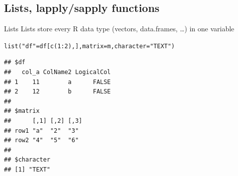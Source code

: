 \documentclass[xcolor=table,       handout,    xcolor=dvipsnames]{beamer}\usepackage[]{graphicx}\usepackage[]{color}
\makeatletter
\newcommand{\hlnum}[1]{\textcolor[rgb]{0,0,0}{#1}}
\newcommand{\hlstr}[1]{\textcolor[rgb]{0.545,0.137,0.137}{#1}}
\newcommand{\hlopt}[1]{\textcolor[rgb]{0,0,0}{#1}}
\newcommand{\hlstd}[1]{\textcolor[rgb]{0,0,0}{#1}}
\newcommand{\hlkwc}[1]{\textcolor[rgb]{1,0,1}{#1}}
\newcommand{\hlkwd}[1]{\textcolor[rgb]{0,0,1}{#1}}
\newenvironment{kframe}{%
 \def\at@end@of@kframe{}%
 \ifinner\ifhmode%
  \def\at@end@of@kframe{\end{minipage}}%
  \begin{minipage}{\columnwidth}%
 \fi\fi%
 \def\FrameCommand##1{\hskip\@totalleftmargin \hskip-\fboxsep
 \colorbox{shadecolor}{##1}\hskip-\fboxsep
     \hskip-\linewidth \hskip-\@totalleftmargin \hskip\columnwidth}%
 \MakeFramed {\advance\hsize-\width
   \@totalleftmargin\z@ \linewidth\hsize
   \@setminipage}}%
 {\par\unskip\endMakeFramed%
 \at@end@of@kframe}
\newenvironment{knitrout}{}{} %
\makeatother
\begin{document}
\subsection{Lists, lapply/sapply functions}

\begin{frame}[fragile]{Lists}
Lists store every R data type (vectors, data.frames, \ldots) in one variable
\begin{knitrout}\small
{}\color{fgcolor}\begin{kframe}
\begin{alltt}
\hlkwd{list}\hlstd{(}\hlstr{"df"}\hlstd{=df[}\hlkwd{c}\hlstd{(}\hlnum{1}\hlopt{:}\hlnum{2}\hlstd{), ],} \hlkwc{matrix}\hlstd{=m,} \hlkwc{character}\hlstd{=}\hlstr{"TEXT"}\hlstd{)}
\end{alltt}
\begin{verbatim}
## $df
##   col_a ColName2 LogicalCol
## 1    11        a      FALSE
## 2    12        b      FALSE
## 
## $matrix
##      [,1] [,2] [,3]
## row1 "a"  "2"  "3" 
## row2 "4"  "5"  "6" 
## 
## $character
## [1] "TEXT"
\end{verbatim}
\end{kframe}
\end{knitrout}
\end{frame}

\end{document}

